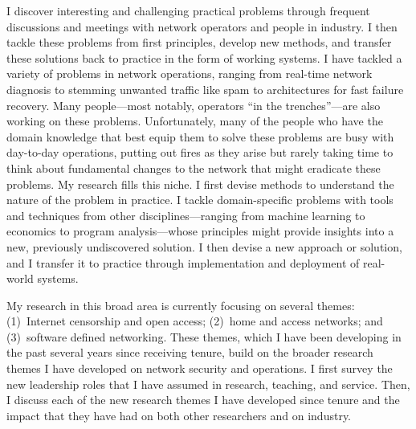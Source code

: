 I discover interesting and challenging practical problems through
frequent discussions and meetings with network operators and people in
industry.  I then tackle these problems from first principles, develop
new methods, and transfer these solutions back to practice in the form
of working systems.  I have tackled a variety of problems in network
operations, ranging from real-time network diagnosis to stemming
unwanted traffic like spam to architectures for fast failure recovery.
Many people---most notably, operators ``in the trenches''---are also
working on these problems.  Unfortunately, many of the people who have
the domain knowledge that best equip them to solve these problems are
busy with day-to-day operations, putting out fires as they arise but
rarely taking time to think about fundamental changes to the network
that might eradicate these problems.  My research fills this niche.  I
first devise methods to understand the nature of the problem in
practice.  I tackle domain-specific problems with tools and techniques
from other disciplines---ranging from machine learning to economics to
program analysis---whose principles might provide insights into a new,
previously undiscovered solution.  I then devise a new approach or
solution, and I transfer it to practice through implementation and
deployment of real-world systems.

My research in this broad area is currently focusing on several themes:
(1)~Internet censorship and open access; (2)~home and access networks;
and (3)~software defined networking.  These themes, which I have been
developing in the past several years since receiving tenure, build on
the broader research themes I have developed on network security and
operations.  I first survey the new leadership roles that I have assumed
in research, teaching, and service.  Then, I discuss each of the new
research themes I have developed since tenure and the impact that they
have had on both other researchers and on industry.


